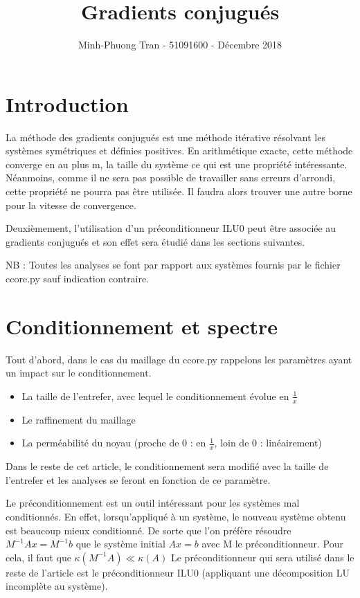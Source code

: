 \documentclass[11pt]{article}
\title{\vspace*{-12mm}
Gradients conjugués}
\author{\small{Minh-Phuong Tran - 51091600 - Décembre 2018}}
\date{}
\begin{document}
\maketitle
\vspace*{-12mm}


\section{Introduction}
La méthode des gradients conjugués est une méthode itérative résolvant les systèmes symétriques et définies positives. En arithmétique exacte, cette méthode converge en au plus m, la taille du système ce qui est une propriété intéressante. Néanmoins, comme il ne sera pas possible de travailler sans erreurs d'arrondi, cette propriété ne pourra pas être utilisée. Il faudra alors trouver une autre borne pour la vitesse de convergence.

Deuxièmement, l'utilisation d'un préconditionneur ILU0 peut être associée au gradients conjugués et son effet sera étudié dans les sections suivantes.

NB : Toutes les analyses se font par rapport aux systèmes fournis par le fichier ccore.py sauf indication contraire.
\section{Conditionnement et spectre}
Tout d'abord, dans le cas du maillage du ccore.py rappelons les paramètres ayant un impact sur le conditionnement.
\begin{itemize}
    \item La taille de l'entrefer, avec lequel le conditionnement évolue en $\frac{1}{x}$
    \item Le raffinement du maillage
    \item La perméabilité du noyau (proche de 0 : en $\frac{1}{x}$, loin de 0 : linéairement) 
\end{itemize}
Dans le reste de cet article, le conditionnement sera modifié avec la taille de l'entrefer et les analyses se feront en fonction de ce paramètre.

Le préconditionnement est un outil intéressant pour les systèmes mal conditionnés. En effet, lorsqu'appliqué à un système, le nouveau système obtenu est beaucoup mieux conditionné. De sorte que l'on préfère résoudre $M^{-1} A x= M^{-1}b$ que le système initial $A x = b$ avec M le préconditionneur. Pour cela, il faut que $\kappa(M^{-1}A)\ll \kappa(A)$
Le préconditionneur qui sera utilisé dans le reste de l'article est le préconditionneur ILU0 (appliquant une décomposition LU incomplète au système).
\end{document}
